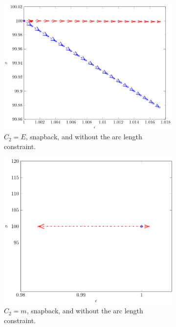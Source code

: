 \documentclass[10pt]{elsarticle}
\begin{document}
\begin{figure}
\begin{subfigure}{0.45\textwidth}
		\centering
		\includegraphics[scale=0.7]{./conv_figs/bad_metric_snap_no_arclength.pdf}
		\caption{$C_2=E$, snapback, and without the arc length constraint.}
		\label{bad_metric_snap_no_arclength}
	\end{subfigure}
	\hfill
	\begin{subfigure}{0.45\textwidth}
		\centering
		\includegraphics[scale=0.7]{./conv_figs/good_metric_snap_no_arclength.pdf}
		\caption{$C_2=m$, snapback, and without the arc length constraint.}
		\label{good_metric_snap_no_arclength}
	\end{subfigure}
	\begin{subfigure}{0.45\textwidth}

\end{subfigure}
\end{figure}
\end{document}
